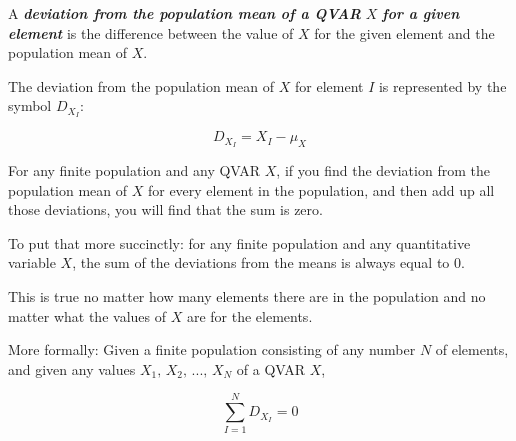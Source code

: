 \documentclass[
  letterpaper,
  DIV=11,
  numbers=noendperiod]{scrartcl}
\begin{document}
\begin{tcolorbox}[enhanced jigsaw, colback=white, breakable, opacityback=0, leftrule=.75mm, arc=.35mm, colframe=quarto-callout-note-color-frame, title=\textcolor{quarto-callout-note-color}{\faInfo}\hspace{0.5em}{Definition}, left=2mm, rightrule=.15mm, bottomtitle=1mm, coltitle=black, titlerule=0mm, bottomrule=.15mm, toptitle=1mm, colbacktitle=quarto-callout-note-color!10!white, opacitybacktitle=0.6, toprule=.15mm]

A \textbf{\emph{deviation from the population mean of a QVAR}} \(X\)
\textbf{\emph{for a given element}} is the difference between the value
of \(X\) for the given element and the population mean of \(X\).

The deviation from the population mean of \(X\) for element \(I\) is
represented by the symbol \(D_{X_I}\):

\[D_{X_I} = X_I - \mu_X\]

\end{tcolorbox}

\begin{tcolorbox}[enhanced jigsaw, colback=white, breakable, opacityback=0, leftrule=.75mm, arc=.35mm, colframe=quarto-callout-tip-color-frame, title=\textcolor{quarto-callout-tip-color}{\faLightbulb}\hspace{0.5em}{Fact}, left=2mm, rightrule=.15mm, bottomtitle=1mm, coltitle=black, titlerule=0mm, bottomrule=.15mm, toptitle=1mm, colbacktitle=quarto-callout-tip-color!10!white, opacitybacktitle=0.6, toprule=.15mm]

For any finite population and any QVAR \(X\), if you find the deviation
from the population mean of \(X\) for every element in the population,
and then add up all those deviations, you will find that the sum is
zero.

\end{tcolorbox}

To put that more succinctly: for any finite population and any
quantitative variable \(X\), the sum of the deviations from the means is
always equal to 0.

This is true no matter how many elements there are in the population and
no matter what the values of \(X\) are for the elements.

More formally: Given a finite population consisting of any number \(N\)
of elements, and given any values \(X_1,\,X_2,\,...,\,X_N\) of a QVAR
\(X\),

\[\sum_{I=1}^N D_{X_I} = 0\]
\end{document}
